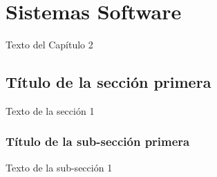 
\chapter{Sistemas Software}

Texto del Capítulo 2

\section{Título de la sección primera}

Texto de la sección 1


\subsection{Título de la sub-sección primera}

Texto de la sub-sección 1

